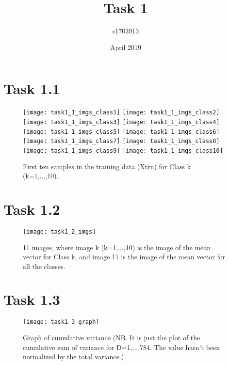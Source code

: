 \documentclass[12pt]{extarticle}
\title{Task 1}
\author{s1703913}
\date{April 2019}
\begin{document}
\maketitle
\pagebreak

\section{Task 1.1}
\begin{figure}[h!]
\caption{First ten samples in the training data (Xtrn) for Class k (k=1,...,10).}
\centering
\texttt{[image: task1\_1\_imgs\_class1]}
\texttt{[image: task1\_1\_imgs\_class2]}
\texttt{[image: task1\_1\_imgs\_class3]}
\texttt{[image: task1\_1\_imgs\_class4]}
\texttt{[image: task1\_1\_imgs\_class5]}
\texttt{[image: task1\_1\_imgs\_class6]}
\texttt{[image: task1\_1\_imgs\_class7]}
\texttt{[image: task1\_1\_imgs\_class8]}
\texttt{[image: task1\_1\_imgs\_class9]}
\texttt{[image: task1\_1\_imgs\_class10]}
\end{figure}
\pagebreak

\section{Task 1.2}
\begin{figure}[h!]
\caption{11 images, where image k (k=1,...,10) is the image of
   the mean vector for Class k, and image 11 is the image of the mean
   vector for all the classes.}
\centering
\texttt{[image: task1\_2\_imgs]}
\end{figure}
\pagebreak

\section{Task 1.3}
\begin{figure}[h!]
\caption{Graph of cumulative variance (NB. It is just the plot of the cumulative sum of variance for D=1,...,784. The value hasn't been normalized by the total variance.)}
\centering
\texttt{[image: task1\_3\_graph]}
\end{figure}
\pagebreak
\end{document}
